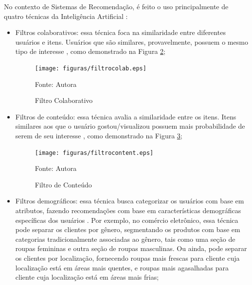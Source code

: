 No contexto de Sistemas de Recomendação, é feito o uso principalmente de quatro técnicas da Inteligência Artificial 
\cite{stratoflow-recommendation}:
\begin{itemize}
\item Filtros colaborativos: essa técnica foca na similaridade entre diferentes usuários e itens. Usuários que são
similares, provavelmente, possuem o mesmo tipo de interesse \cite{pham2019recommendation}, como demonstrado na Figura 
\hyperref[fig:filtrocolab]{2};

\begin{figure}[htbp]
    \centering
    \caption{Filtro Colaborativo}
    \label{fig:filtrocolab}
    
    \vspace{2pt} %
    
    \texttt{[image: figuras/filtrocolab.eps]}
    
    \vspace{2pt} %
    
    \small Fonte: Autora
\end{figure}

\item Filtros de conteúdo: essa técnica avalia a similaridade entre os itens. Itens similares aos que o usuário gostou/visualizou
possuem mais probabilidade de serem de seu interesse \cite{stratoflow-recommendation}, 
como demonstrado na Figura 
\hyperref[fig:filtrocont]{3};

\begin{figure}[htbp]
    \centering
    \caption{Filtro de Conteúdo}
    \label{fig:filtrocont}
    
    \vspace{2pt} %
    
    \texttt{[image: figuras/filtrocontent.eps]}
    
    \vspace{2pt} %
    
    \small Fonte: Autora
\end{figure}

\item Filtros demográficos: essa técnica busca categorizar os usuários com base em atributos, fazendo recomendações
com base em características demográficas específicas dos usuários \cite{burke2002hybrid}. Por exemplo, no comércio eletrônico, 
essa técnica pode separar os clientes por gênero, segmentando os produtos com base em categorias 
tradicionalmente associadas ao gênero, tais como uma seção de roupas femininas e outra seção de roupas masculinas. Ou ainda,
pode separar os clientes por localização, fornecendo roupas mais frescas para cliente cuja localização está em áreas mais quentes,
e roupas mais agasalhadas para cliente cuja localização está em áreas mais frias;


\end{itemize}
